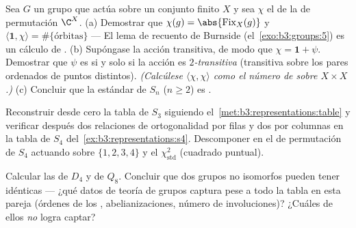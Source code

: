 \begin{exercise}[$\star$]\label{exo:b3:representations:2}
Sea $G$ un grupo que actúa sobre un conjunto finito $X$ y sea $\chi$ el
 de la
 de permutación
$\C^X$. (a) Demostrar que $\chi(g) = \abs{\operatorname{Fix}_X(g)}$ y
$\langle \mathbf 1, \chi\rangle = \#\{\text{órbitas}\}$ ---
El lema de recuento de Burnside (el~\cref{exo:b3:groups:5}) es un
cálculo de . (b)
Supóngase la acción transitiva, de modo que $\chi = \mathbf 1 +
\psi$. Demostrar que $\psi$ es
 si y solo si la acción
es \emph{$2$-transitiva} (transitiva sobre los pares ordenados de puntos
distintos). \emph{(Calcúlese $\langle\chi,\chi\rangle$ como el número de
 sobre $X \times X$.)} (c)
Concluir que la 
estándar de $S_n$ ($n \geq
2$) es .
\end{exercise}

\begin{exercise}[$\star$]\label{exo:b3:representations:3}
Reconstruir desde cero la tabla de $S_3$ siguiendo
el~\cref{met:b3:representations:table} y verificar después dos
relaciones de ortogonalidad por filas y dos por columnas en la tabla de
$S_4$ del~\cref{ex:b3:representations:s4}. Descomponer en
 el
 de permutación de
$S_4$ actuando sobre $\{1,2,3,4\}$ y el
$\chi_{\mathrm{std}}^2$ (cuadrado puntual).
\end{exercise}

\begin{exercise}[$\star\star$]\label{exo:b3:representations:4}
Calcular las 
de $D_4$ y de $Q_8$. Concluir que dos grupos no isomorfos pueden tener
 idénticas
--- ¿qué datos de teoría de grupos captura pese a todo la tabla en esta
pareja (órdenes de los ,
abelianizaciones, número de involuciones)? ¿Cuáles de ellos \emph{no}
logra captar?
\end{exercise}

